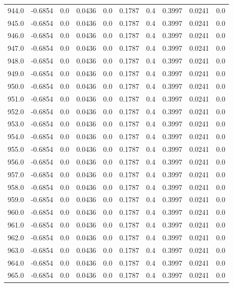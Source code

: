 \begin{longtable}{lrrrrrrrrr}
944.0 & -0.6854 & 0.0 & 0.0436 & 0.0 & 0.1787 & 0.4 & 0.3997 & 0.0241 & 0.0 \\
945.0 & -0.6854 & 0.0 & 0.0436 & 0.0 & 0.1787 & 0.4 & 0.3997 & 0.0241 & 0.0 \\
946.0 & -0.6854 & 0.0 & 0.0436 & 0.0 & 0.1787 & 0.4 & 0.3997 & 0.0241 & 0.0 \\
947.0 & -0.6854 & 0.0 & 0.0436 & 0.0 & 0.1787 & 0.4 & 0.3997 & 0.0241 & 0.0 \\
948.0 & -0.6854 & 0.0 & 0.0436 & 0.0 & 0.1787 & 0.4 & 0.3997 & 0.0241 & 0.0 \\
949.0 & -0.6854 & 0.0 & 0.0436 & 0.0 & 0.1787 & 0.4 & 0.3997 & 0.0241 & 0.0 \\
950.0 & -0.6854 & 0.0 & 0.0436 & 0.0 & 0.1787 & 0.4 & 0.3997 & 0.0241 & 0.0 \\
951.0 & -0.6854 & 0.0 & 0.0436 & 0.0 & 0.1787 & 0.4 & 0.3997 & 0.0241 & 0.0 \\
952.0 & -0.6854 & 0.0 & 0.0436 & 0.0 & 0.1787 & 0.4 & 0.3997 & 0.0241 & 0.0 \\
953.0 & -0.6854 & 0.0 & 0.0436 & 0.0 & 0.1787 & 0.4 & 0.3997 & 0.0241 & 0.0 \\
954.0 & -0.6854 & 0.0 & 0.0436 & 0.0 & 0.1787 & 0.4 & 0.3997 & 0.0241 & 0.0 \\
955.0 & -0.6854 & 0.0 & 0.0436 & 0.0 & 0.1787 & 0.4 & 0.3997 & 0.0241 & 0.0 \\
956.0 & -0.6854 & 0.0 & 0.0436 & 0.0 & 0.1787 & 0.4 & 0.3997 & 0.0241 & 0.0 \\
957.0 & -0.6854 & 0.0 & 0.0436 & 0.0 & 0.1787 & 0.4 & 0.3997 & 0.0241 & 0.0 \\
958.0 & -0.6854 & 0.0 & 0.0436 & 0.0 & 0.1787 & 0.4 & 0.3997 & 0.0241 & 0.0 \\
959.0 & -0.6854 & 0.0 & 0.0436 & 0.0 & 0.1787 & 0.4 & 0.3997 & 0.0241 & 0.0 \\
960.0 & -0.6854 & 0.0 & 0.0436 & 0.0 & 0.1787 & 0.4 & 0.3997 & 0.0241 & 0.0 \\
961.0 & -0.6854 & 0.0 & 0.0436 & 0.0 & 0.1787 & 0.4 & 0.3997 & 0.0241 & 0.0 \\
962.0 & -0.6854 & 0.0 & 0.0436 & 0.0 & 0.1787 & 0.4 & 0.3997 & 0.0241 & 0.0 \\
963.0 & -0.6854 & 0.0 & 0.0436 & 0.0 & 0.1787 & 0.4 & 0.3997 & 0.0241 & 0.0 \\
964.0 & -0.6854 & 0.0 & 0.0436 & 0.0 & 0.1787 & 0.4 & 0.3997 & 0.0241 & 0.0 \\
965.0 & -0.6854 & 0.0 & 0.0436 & 0.0 & 0.1787 & 0.4 & 0.3997 & 0.0241 & 0.0 \\

\end{longtable}
